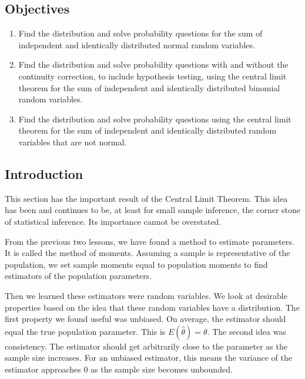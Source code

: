 \documentclass[]{book}
\providecommand{\tightlist}{%
  \setlength{\itemsep}{0pt}\setlength{\parskip}{0pt}}
\theoremstyle{definition}
\theoremstyle{definition}
\theoremstyle{definition}
\theoremstyle{remark}
\begin{document}
\subsection{Objectives}\label{objectives-19}

\begin{enumerate}
\def\labelenumi{\arabic{enumi}.}
\tightlist
\item
  Find the distribution and solve probability questions for the sum of
  independent and identically distributed normal random variables.\\
\item
  Find the distribution and solve probability questions with and without
  the continuity correction, to include hypothesis testing, using the
  central limit theorem for the sum of independent and identically
  distributed binomial random variables.\\
\item
  Find the distribution and solve probability questions using the
  central limit theorem for the sum of independent and identically
  distributed random variables that are not normal.
\end{enumerate}

\subsection{Introduction}\label{introduction-1}

This section has the important result of the Central Limit Theorem. This
idea has been and continues to be, at least for small sample inference,
the corner stone of statistical inference. Its importance cannot be
overstated.

From the previous two lessons, we have found a method to estimate
parameters. It is called the method of moments. Assuming a sample is
representative of the population, we set sample moments equal to
population moments to find estimators of the population parameters.

Then we learned these estimators were random variables. We look at
desirable properties based on the idea that these random variables have
a distribution. The first property we found useful was unbiased. On
average, the estimator should equal the true population parameter. This
is \(E(\hat{\theta})=\theta\). The second idea was consistency. The
estimator should get arbitrarily close to the parameter as the sample
size increases. For an unbiased estimator, this means the variance of
the estimator approaches 0 as the sample size becomes unbounded.
\end{document}
